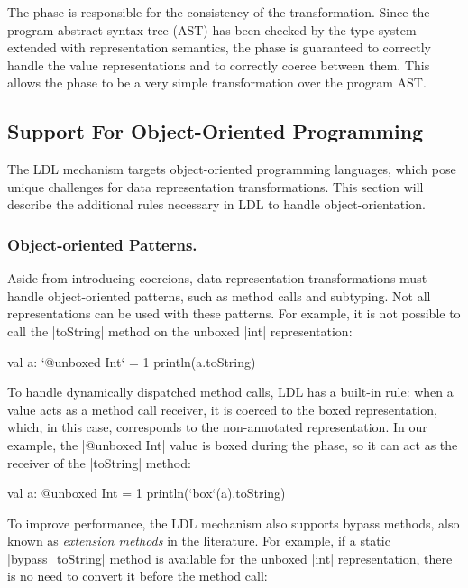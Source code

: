 The \commit{} phase is responsible for the consistency of the transformation. Since the program abstract syntax tree (AST) has been checked by the type-system extended with representation semantics, the \commit{} phase is guaranteed to correctly handle the value representations and to correctly coerce between them. This allows the \commit{} phase to be a very simple transformation over the program AST.

\subsection{Support For Object-Oriented Programming}
\label{sec:ldl:oo-patterns}

The LDL mechanism targets object-oriented programming languages, which pose unique challenges for data representation transformations. This section will describe the additional rules necessary in LDL to handle object-orientation.

\subsubsection{Object-oriented Patterns.} Aside from introducing coercions, data representation transformations must handle object-oriented patterns, such as method calls and subtyping. Not all representations can be used with these patterns. For example, it is not possible to call the |toString| method on the unboxed |int| representation:

\begin{lstlisting-nobreak}
val a: `@unboxed Int` = 1
println(a.toString)
\end{lstlisting-nobreak}

To handle dynamically dispatched method calls, LDL has a built-in rule: when a value acts as a method call receiver, it is coerced to the boxed representation, which, in this case, corresponds to the non-annotated representation. In our example, the |@unboxed Int| value is boxed during the \coerce{} phase, so it can act as the receiver of the |toString| method:

\begin{lstlisting-nobreak}
val a: @unboxed Int = 1
println(`box`(a).toString)
\end{lstlisting-nobreak}

To improve performance, the LDL mechanism also supports bypass methods, also known as
\emph{extension methods} in the literature. For example, if a static |bypass_toString| method is available for the unboxed |int| representation, there is no need to convert it before the method call:

